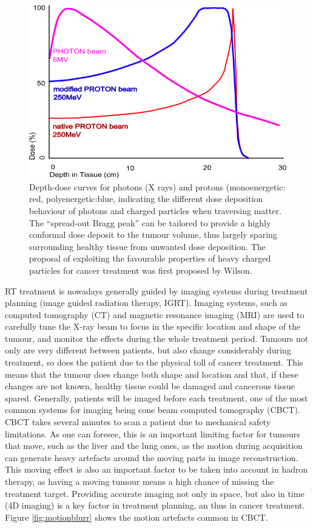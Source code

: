 \begin{figure}[ht]
\begin{center}
\includegraphics[width=0.6\columnwidth]{Introduction/BraggPeak.png}
\caption[Bragg peak]{ Depth-dose curves for photons (X rays) and protons (monoenergetic: red, polyenergetic:blue, indicating the different dose deposition behaviour of photons and charged particles when traversing matter. The ``spread-out Bragg peak'' can be tailored to provide a highly conformal dose deposit to the tumour volume, thus largely sparing surrounding healthy tissue from unwanted dose deposition. The proposal of  exploiting the favourable properties of heavy charged particles for cancer treatment was first proposed by Wilson\cite{wilson1946radiological}.}
\label{fig:bragg}
\end{center}
\end{figure}


RT treatment is nowadays generally guided by imaging systems during treatment planning (image guided radiation therapy, IGRT). Imaging systems, such as computed tomography (CT) and magnetic resonance imaging (MRI) are used to carefully tune the X-ray beam to focus in the specific location and shape of the tumour, and monitor the effects during the whole treatment period. Tumours not only are very different between patients, but also change considerably during treatment, so does the patient due to the physical toll of cancer treatment. This means that the tumour does change both shape and location and that, if these changes are not known, healthy tissue could be damaged and cancerous tissue spared. Generally, patients will be imaged before each treatment,  one of the most common systems for imaging being cone beam computed tomography (CBCT). CBCT takes several minutes to scan a patient due to mechanical safety limitations. As one can foresee, this is an important limiting factor for tumours that move, such as the liver and the lung ones, as the motion during acquisition can generate heavy artefacts around the moving parts in image reconstruction. This moving effect is also an important factor to be taken into account in hadron therapy, as having a moving tumour means a high chance of missing the treatment target. Providing accurate imaging not only in space, but also in time (4D imaging) is a key factor in treatment planning, an thus in cancer treatment. Figure \ref{fig:motionblurr} shows the motion artefacts common in CBCT.

